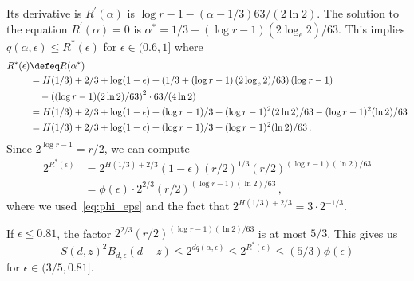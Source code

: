   Its derivative is $R^\prime(\alpha)$ is $\log r - 1 - (\alpha - 1/3)63/(2 \ln 2)$. 
  The solution to the equation $R^\prime(\alpha) = 0$ is 
  $\alpha^* = 1/3 + \left( \log r - 1\right) (2 \log_e 2)/63$.
  This implies $q(\alpha, \epsilon) \leq R^*(\epsilon)$ for $\epsilon \in (0.6, 1]$ where
  \begin{align*}
      R^*(\epsilon)&\defeq R(\alpha^*) \\
      &= H(1/3) + 2/3 + \log(1-\epsilon)
          + \left( 1/3 + \left( \log r - 1\right) (2 \log_e 2)/63 \right) (\log r - 1) \\
      &{\quad}    - \left( (\log r - 1) (2 \ln 2)/63 \right)^2 \cdot 63/(4\ln 2) \\
      &= H(1/3) + 2/3 + \log(1-\epsilon)
          + (\log r - 1)/3 + (\log r - 1)^2 (2 \ln 2)/63  
          - (\log r - 1)^2 (\ln 2)/63 \\
      &= H(1/3) + 2/3 + \log(1-\epsilon)
          + (\log r - 1)/3 + (\log r - 1)^2 (\ln 2)/63  
          \,.
  \end{align*}
  Since $2^{\log r - 1} = r/2$, we can compute
  \begin{align*}
      2^{R^*(\epsilon)}
      &= 2^{H(1/3)+2/3}(1-\epsilon) (r/2)^{1/3} (r/2)^{(\log r - 1)(\ln 2)/63} \\
      &= \phi(\epsilon) \cdot 2^{2/3} (r/2)^{(\log r - 1)(\ln 2)/63}
      \,,
  \end{align*}
  where we used~\eqref{eq:phi_eps} and the fact that $2^{H(1/3) + 2/3} = 3\cdot2^{-1/3}$.

  If $\epsilon \leq 0.81$, the factor $2^{2/3} (r/2)^{(\log r - 1)(\ln 2)/63}$ is at most $5/3$. 
  This gives us 
  \[
      S(d, z)^2 B_{d,\epsilon}(d-z) 
      \leq 2^{d q(\alpha, \epsilon)} 
      \leq 2^{R^*(\epsilon)} 
      \leq (5/3) \phi(\epsilon)
  \]
  for $\epsilon \in (3/5, 0.81]$.

